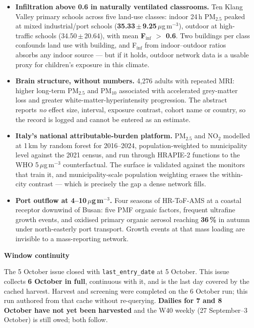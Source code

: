 \documentclass[10pt]{article}
\begin{document}
\footnotesize
\begin{itemize}

\item \textbf{Infiltration above 0.6 in naturally ventilated classrooms.} Ten Klang Valley primary schools
across five land-use classes: indoor 24\,h PM$_{2.5}$ peaked at mixed industrial/port schools
(\textbf{35.33\,$\pm$\,9.25}\,$\mu$g\,m$^{-3}$), outdoor at high-traffic schools (34.50\,$\pm$\,20.64), with
mean \textbf{F$_{\textrm{inf}}$ $>$ 0.6}. Two buildings per class confounds land use with building, and
F$_{\textrm{inf}}$ from indoor--outdoor ratios absorbs any indoor source --- but if it holds, outdoor
network data is a usable proxy for children's exposure in this climate.

\item \textbf{Brain structure, without numbers.} 4,276 adults with repeated MRI: higher long-term PM$_{2.5}$
and PM$_{10}$ associated with accelerated grey-matter loss and greater white-matter-hyperintensity
progression. The abstract reports \textit{no} effect size, interval, exposure contrast, cohort name or
country, so the record is logged and cannot be entered as an estimate.

\item \textbf{Italy's national attributable-burden platform.} PM$_{2.5}$ and NO$_2$ modelled at 1\,km by
random forest for 2016--2024, population-weighted to municipality level against the 2021 census, and run
through HRAPIE-2 functions to the WHO 5\,$\mu$g\,m$^{-3}$ counterfactual. The surface is validated against
the monitors that train it, and municipality-scale population weighting erases the within-city contrast ---
which is precisely the gap a dense network fills.

\item \textbf{Port outflow at 4--10\,$\mu$g\,m$^{-3}$.} Four seasons of HR-ToF-AMS at a coastal receptor
downwind of Busan: five PMF organic factors, frequent ultrafine growth events, and oxidised primary organic
aerosol reaching \textbf{36\,\%} in autumn under north-easterly port transport. Growth events at that mass
loading are invisible to a mass-reporting network.

\end{itemize}

\vspace{2mm}

\begin{keybox}
{\sffamily\bfseries\footnotesize\color{Deep}Window continuity}\\[1.2mm]
{\fontsize{7.2}{8.8}\selectfont
The 5 October issue closed with \texttt{last\_entry\_date} at 5 October. This issue collects
\textbf{6 October in full}, continuous with it, and is the last day covered by the cached harvest. Harvest
and screening were completed on the 6 October run; this run authored from that cache without re-querying.
\textbf{Dailies for 7 and 8 October have not yet been harvested} and the W40 weekly (27 September--3
October) is still owed; both follow.\par}
\end{keybox}
\end{document}
